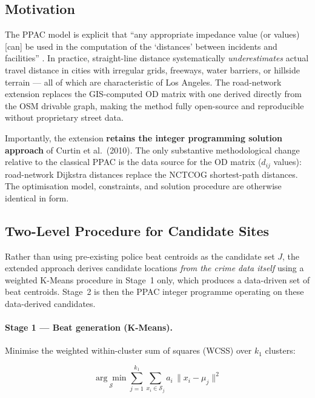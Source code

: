 \documentclass[12pt]{article}
\begin{document}
\subsection{Motivation}

The PPAC model is explicit that ``any appropriate impedance value (or values)
[can] be used in the computation of the `distances' between incidents and
facilities'' \cite{curtin2010}.  In practice, straight-line distance
systematically \emph{underestimates} actual travel distance in cities with
irregular grids, freeways, water barriers, or hillside terrain --- all of
which are characteristic of Los Angeles.  The road-network extension replaces
the GIS-computed OD matrix with one derived directly from the OSM drivable
graph, making the method fully open-source and reproducible without proprietary
street data.

Importantly, the extension \textbf{retains the integer programming solution
approach} of Curtin et al.\ (2010).  The only substantive methodological
change relative to the classical PPAC is the data source for the OD matrix
($d_{ij}$ values): road-network Dijkstra distances replace the NCTCOG
shortest-path distances.  The optimisation model, constraints, and
solution procedure are otherwise identical in form.

\subsection{Two-Level Procedure for Candidate Sites}

Rather than using pre-existing police beat centroids as the candidate set $J$,
the extended approach derives candidate locations \emph{from the crime data
itself} using a weighted K-Means procedure in Stage~1 only, which produces
a data-driven set of beat centroids.  Stage~2 is then the PPAC integer
programme operating on these data-derived candidates.

\paragraph{Stage 1 --- Beat generation (K-Means).}
Minimise the weighted within-cluster sum of squares (WCSS) over $k_1$ clusters:

\begin{equation}
    \underset{\mathcal{S}}{\arg\min}
    \sum_{j=1}^{k_1} \sum_{x_i \in \mathcal{S}_j}
    a_i \,\| x_i - \mu_j \|^2
    \label{eq:wcss}
\end{equation}
\end{document}
